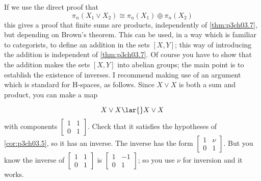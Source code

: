 \documentclass[../main]{subfiles}
\begin{document}
\begin{remark*}
If we use the direct proof that \[\pi_n(X_1\vee X_2)\cong \pi_n(X_1)\oplus \pi_n(X_2)\]
this gives a proof that finite sums are products, independently of \ref{thm:p3ch03.7},
but depending on Brown's theorem. This can be used, in a way which is
familiar to categorists, to define an addition in the sets $[X, Y]$; this
way of introducing the addition is independent of \ref{thm:p3ch03.7}. Of course you have
to show that the addition makes the sets $[X,Y]$ into abelian groups; the
main point is to establish the existence of inverses. I recommend making
use of an argument which is standard for H-spaces, as follows. Since
$X\vee X$ is both a sum and product, you can make a map

\[X\vee X\lar{} X\vee X\]
with components $\begin{bmatrix}1&1\\0&1\end{bmatrix}$. Check that it satisfies the hypotheses of \ref{cor:p3ch03.5}, so it has an inverse. The inverse has the form $\begin{bmatrix}1&\nu\\0&1\end{bmatrix}$. But you know the inverse of $\begin{bmatrix}1&1\\0&1\end{bmatrix}$ is $\begin{bmatrix}1&-1\\0&1\end{bmatrix}$; so you use $\nu$ for inversion and it works.
\end{remark*}
\end{document}
